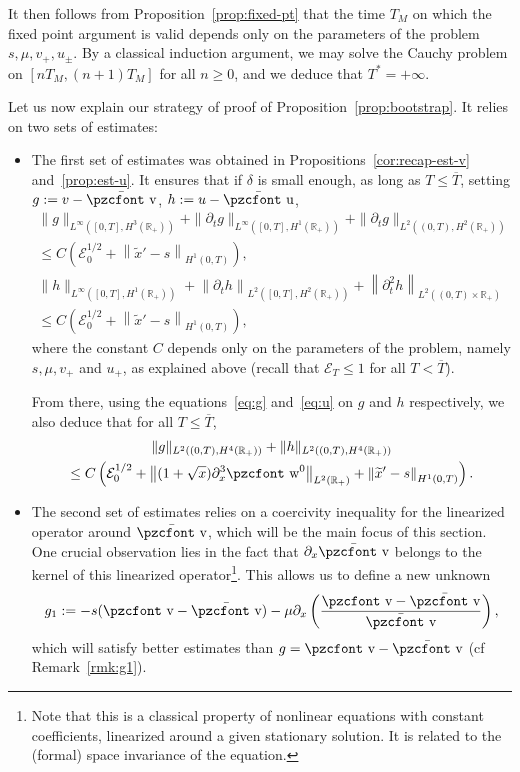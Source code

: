 \documentclass[10pt]{amsart}
\theoremstyle{definition}\newtheorem{defi}[theo]{Definition}\newtheorem{rema}[theo]{Remark}\newtheorem{exam}[theo]{Example}\newtheorem{exem}[theo]{Example}\newtheorem{nota}[theo]{Notation}
\newcommand{\mathpzc}[1]{\text{\pzcfont #1}}
\newcommand{\R}{\mathbb{R}}
\newcommand{\p}{\partial}
\newcommand{\bv}{\bar{\mathpzc{v}}}
\newcommand{\bu}{\bar{\mathpzc{u}}}
\newcommand{\cE}{\mathcal E}
\newcommand{\tv}{\mathpzc{v}}
\newcommand{\tw}{\mathpzc{w}}
\newcommand{\tx}{\widetilde{x}}
\begin{document}
It then follows from Proposition~\ref{prop:fixed-pt} that the time $T_M$ on which the fixed point argument is valid depends only on the parameters of the problem $s,\mu, v_+,u_\pm$. By a classical induction argument, we may solve the Cauchy problem on $[nT_M, (n+1)T_M]$ for all $n\geq 0$, and we deduce that $T^*=+\infty$.


Let us now explain our strategy of proof of Proposition~\ref{prop:bootstrap}. It relies on two sets of estimates:
\begin{itemize}
\item The first set of estimates was obtained in Propositions~\ref{cor:recap-est-v} and~\ref{prop:est-u}. It ensures that if $\delta$ is small enough, as long as $T\leq \overline{T}$, setting $g:=v-\bv$, $h := u -\bu$,
\begin{align}
\|g\|_{L^\infty\left([0,T], H^3(\R_+)\right)} + \|\partial_t g\|_{L^\infty\left([0,T], H^1(\R_+)\right)} + \|\p_t g\|_{L^2\left((0,T), H^2(\R_+)\right)}\label{est:g-global}\\
\leq C \left(\cE_0^{1/2} + \left\|\tx'-s\right\|_{H^1(0,T)}\right),\nonumber
\\
\|h\|_{L^\infty\left([0,T], H^1(\R_+)\right)}+ \left\|\partial_t h \right\|_{L^2\left([0,T], H^2(\R_+)\right)} + \left\|\partial^2_t h\right\|_{L^2\left((0,T)\times \R_+\right)}\label{est:h-global}\\
\leq C (\cE_0^{1/2} + \left\|\tx'-s\right\|_{H^1(0,T)}),\nonumber
\end{align}
where the constant $C$ depends only on the parameters of the problem, namely $s,\mu,v_+$ and $u_+$, as explained above (recall that $\cE_T\leq 1$ for all $T<\overline{T}$).



From there, using the equations~\eqref{eq:g} and~\eqref{eq:u} on $g$ and $h$ respectively, we also deduce that for all $T\leq \overline{T}$,
\begin{multline}\label{est:g-h-global-bis}
\|g\|_{L^2\left((0,T), H^4(\R_+)\right)} + \|h\|_{L^2\left((0,T), H^4(\R_+)\right)}\\
\leq C \left(\cE_0^{1/2} +\left\|(1+\sqrt{x})\p_x^3 \tw^0\right\|_{L^2(\R_+)}+ \left\|\tx'-s\right\|_{H^1(0,T)}\right).
\end{multline}



\item The second set of estimates relies on a coercivity inequality for the linearized operator around $\bv$, which will be the main focus of this section. One crucial observation lies in the fact that $\p_x \bv$ belongs to the kernel of this linearized operator\footnote{Note that this is a classical property of nonlinear equations with constant coefficients, linearized around a given stationary solution. It is related to the (formal) space invariance of the equation.}. This allows us to define a new unknown
\begin{equation}\label{def:g1}
g_1:= - s(\tv - \bv) - \mu \p_x\left(\frac{\tv - \bv}{\bv}\right),
\end{equation} which will satisfy better estimates than $g=\tv-\bv$ (cf Remark~\ref{rmk:g1}).
\end{itemize}
\end{document}
